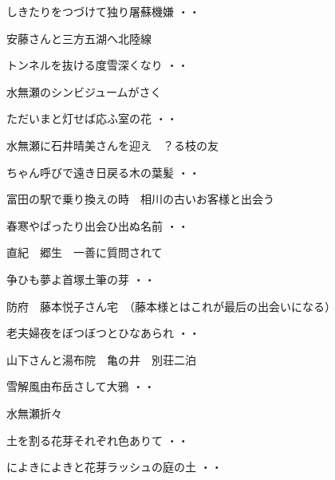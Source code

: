 \begin{shiika}しきたりをつづけて独り屠蘇機嫌
\hfill{・・}\end{shiika}
\vspace{0.6cm}
安藤さんと三方五湖へ北陸線
\begin{shiika}トンネルを抜ける度雪深くなり
\hfill{・・}\end{shiika}
\vspace{0.6cm}
水無瀬のシンビジュームがさく
\begin{shiika}ただいまと灯せば応ふ室の花
\hfill{・・}\end{shiika}
\vspace{0.6cm}
水無瀬に石井晴美さんを迎え　？る枝の友
\begin{shiika}ちゃん呼びで遠き日戻る木の葉髪
\hfill{・・}\end{shiika}
\vspace{0.6cm}
富田の駅で乗り換えの時　相川の古いお客様と出会う
\begin{shiika}春寒やぱったり出会ひ出ぬ名前
\hfill{・・}\end{shiika}
\vspace{0.6cm}
直紀　郷生　一善に質問されて
\begin{shiika}争ひも夢よ首塚土筆の芽
\hfill{・・}\end{shiika}
\vspace{0.6cm}
防府　藤本悦子さん宅　（藤本様とはこれが最后の出会いになる）
\begin{shiika}老夫婦夜をぼつぼつとひなあられ
\hfill{・・}\end{shiika}
\vspace{0.6cm}
山下さんと湯布院　亀の井　別荘二泊
\begin{shiika}雪解風由布岳さして大鴉
\hfill{・・}\end{shiika}
\vspace{0.6cm}
水無瀬折々
\begin{shiika}土を割る花芽それぞれ色ありて
\hfill{・・}\end{shiika}
\begin{shiika}によきによきと花芽ラッシュの庭の土
\hfill{・・}\end{shiika}
